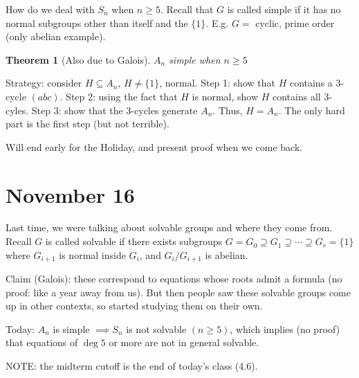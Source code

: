 \documentclass{article}
\theoremstyle{plain}
\newtheorem{theorem}{Theorem}
\theoremstyle{remark}
\begin{document}
How do we deal with $S_n$ when $n\geq 5$.
Recall that $G$ is called simple if it has no normal subgroups
other than itself and the $\{1\}$.
E.g. $G = $ cyclic, prime order (only abelian example).
\begin{theorem}[Also due to Galois]
	$A_n$ simple when $n \geq 5$
\end{theorem}
Strategy: consider $H \subseteq A_n$, $H \neq \{1\}$, normal.
Step 1: show that $H$ contains a $3$-cycle $(abc)$.
Step 2: using the fact that $H$ is normal, show $H$ contains all $3$-cyles.
Step 3: show that the $3$-cycles generate $A_n$.
Thus, $H = A_n$.
The only hard part is the first step (but not terrible).

Will end early for the Holiday, and present proof when we come back.

\section{November 16}
Last time, we were talking about solvable groups and where they come from.
Recall $G$ is called solvable if there exists subgroups
$G = G_0 \supseteq G_1 \supseteq \cdots \supseteq G_r = \{1\}$
where $G_{i+1}$ is normal inside $G_i$, and $G_i/G_{i+1}$ is abelian.

Claim (Galois): these correspond to equations whose roots admit a formula
(no proof: like a year away from us).
But then people saw these solvable groups come up in other contexts,
so started studying them on their own.

Today: $A_n$ is simple $\implies S_n$ is not solvable $(n \geq 5)$,
which implies (no proof) that equations of $\deg{5}$ or more are not in general solvable.

NOTE: the midterm cutoff is the end of today's class (4.6).
\end{document}
